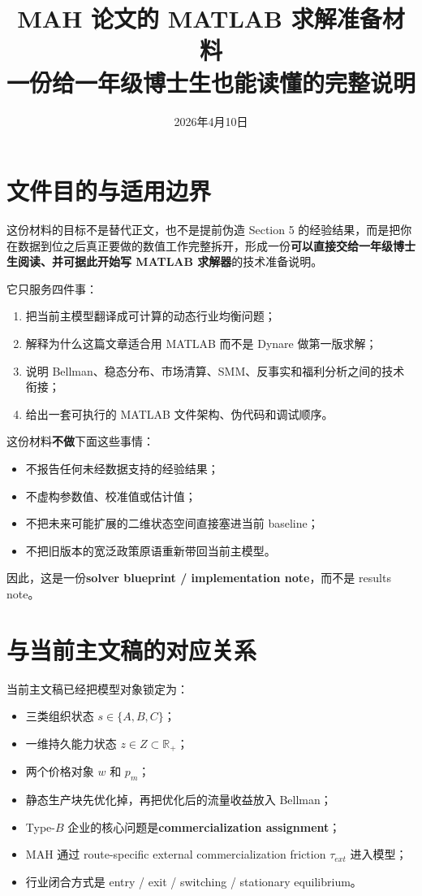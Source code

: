 \documentclass[12pt]{ctexart}
\title{MAH 论文的 MATLAB 求解准备材料\\
\large 一份给一年级博士生也能读懂的完整说明}
\author{}
\date{2026年4月10日}
\begin{document}
\maketitle
\tableofcontents
\newpage

\section{文件目的与适用边界}

这份材料的目标不是替代正文，也不是提前伪造 Section 5 的经验结果，而是把你在数据到位之后真正要做的数值工作完整拆开，形成一份\textbf{可以直接交给一年级博士生阅读、并可据此开始写 MATLAB 求解器}的技术准备说明。

它只服务四件事：
\begin{enumerate}
    \item 把当前主模型翻译成可计算的动态行业均衡问题；
    \item 解释为什么这篇文章适合用 MATLAB 而不是 Dynare 做第一版求解；
    \item 说明 Bellman、稳态分布、市场清算、SMM、反事实和福利分析之间的技术衔接；
    \item 给出一套可执行的 MATLAB 文件架构、伪代码和调试顺序。
\end{enumerate}

这份材料\textbf{不做}下面这些事情：
\begin{itemize}
    \item 不报告任何未经数据支持的经验结果；
    \item 不虚构参数值、校准值或估计值；
    \item 不把未来可能扩展的二维状态空间直接塞进当前 baseline；
    \item 不把旧版本的宽泛政策原语重新带回当前主模型。
\end{itemize}

因此，这是一份\textbf{solver blueprint / implementation note}，而不是 results note。

\section{与当前主文稿的对应关系}

当前主文稿已经把模型对象锁定为：
\begin{itemize}
    \item 三类组织状态 $s\in\{A,B,C\}$；
    \item 一维持久能力状态 $z\in Z\subset \mathbb R_+$；
    \item 两个价格对象 $w$ 和 $p_m$；
    \item 静态生产块先优化掉，再把优化后的流量收益放入 Bellman；
    \item Type-$B$ 企业的核心问题是\textbf{commercialization assignment}；
    \item MAH 通过 route-specific external commercialization friction $\tau_{ext}$ 进入模型；
    \item 行业闭合方式是 entry / exit / switching / stationary equilibrium。
\end{itemize}
\end{document}
